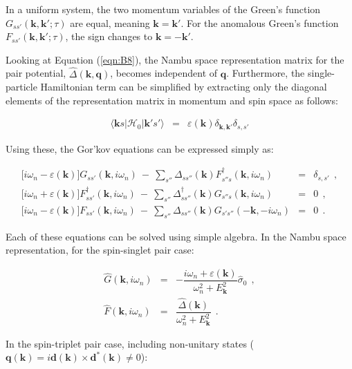 \documentclass[uplatex,a4j,12pt,dvipdfmx]{jsarticle}
\begin{document}
In a uniform system, the two momentum variables of the Green's function $G_{ss'}(\bm{k} , \bm{k}' ; \tau)$ are equal, meaning $\bm{k}=\bm{k}'$. For the anomalous Green's function $F_{ss'}(\bm{k} , \bm{k}' ; \tau)$, the sign changes to $\bm{k}=-\bm{k}'$.

Looking at Equation (\ref{eqn:B8}), the Nambu space representation matrix for the pair potential, $\hat{\Delta}(\bm{k},\bm{q})$, becomes independent of $\bm{q}$. Furthermore, the single-particle Hamiltonian term can be simplified by extracting only the diagonal elements of the representation matrix in momentum and spin space as follows:

\begin{eqnarray}
	\langle \bm{k} s |  \mathcal{H}_{0} | \bm{k}' s' \rangle
	&=&
	\varepsilon(\bm{k}) \delta_{\bm{k},\bm{k}'} \delta_{s,s'}
	\nonumber
\end{eqnarray}

Using these, the Gor'kov equations can be expressed simply as:

\begin{eqnarray}
	\Big[
		i \omega_{n} - \varepsilon(\bm{k})
		\Big]
	G_{ss'}(\bm{k} , i \omega_{n} )
	\ - \
	\sum_{s''}
	\Delta_{s s''}(\bm{k})
	F_{s'' s}^{\dagger}(\bm{k},i \omega_{n})
	&=&
	\delta_{s,s'}
	\ \ ,
	\\[2mm]
	\Big[
		i \omega_{n} + \varepsilon(\bm{k})
		\Big]
	F_{ss'}^{\dagger}(\bm{k} , i \omega_{n} )
	\ - \
	\sum_{s''}
	\Delta_{s s''}^{\dagger}(\bm{k})
	G_{s'' s}(\bm{k},i \omega_{n})
	&=&
	0
	\ \ ,
	\\[2mm]
	\Big[
		i \omega_{n} - \varepsilon(\bm{k})
		\Big]
	F_{ss'}(\bm{k} , i \omega_{n} )
	\ - \
	\sum_{s''}
	\Delta_{s s''}(\bm{k})
	G_{s' s''}( - \bm{k}, - i \omega_{n})
	&=&
	0
	\ \ .
\end{eqnarray}

Each of these equations can be solved using simple algebra. In the Nambu space representation, for the spin-singlet pair case:

\begin{eqnarray}
	\hat{G}(\bm{k},i \omega_{n})
	&=&
	- \dfrac{ i \omega_{n} + \varepsilon(\bm{k}) }{ \omega_{n}^{2} + E_{\bm{k}}^{2} }
	\hat{\sigma}_{0}
	\ \ ,
	\nonumber \\[2mm]
	\hat{F}(\bm{k},i \omega_{n})
	&=&
	\dfrac{ \hat{\Delta}(\bm{k}) }{ \omega_{n}^{2} + E_{\bm{k}}^{2} }
	\ \ .
\end{eqnarray}

In the spin-triplet pair case, including non-unitary states ($\bm{q}(\bm{k}) = i \bm{d}(\bm{k}) \times \bm{d}^{*}(\bm{k}) \neq 0$):
\end{document}
